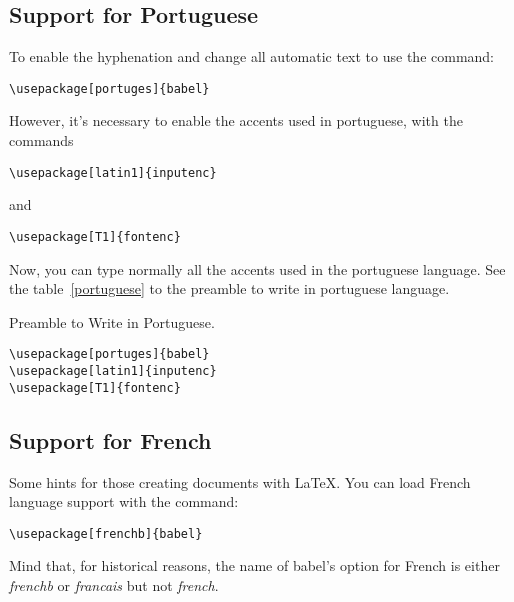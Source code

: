 \pagebreak[4]

\subsection{Support for Portuguese}

To enable the hyphenation and change all automatic text to 
 use the command:
\begin{lscommand}
\verb|\usepackage[portuges]{babel}|
\end{lscommand}

However, it's necessary to enable the accents used in portuguese, with the
commands
\begin{lscommand}
\verb|\usepackage[latin1]{inputenc}|
\end{lscommand}
and
\begin{lscommand}
\verb|\usepackage[T1]{fontenc}|
\end{lscommand}

Now, you can type normally all the accents used in the portuguese language.
See the table~\ref{portuguese} to the preamble to write in portuguese language.

\begin{table}[!hbp]
\caption{Preamble to Write in Portuguese.} \label{portuguese}
\begin{lined}{5cm}
\begin{verbatim}
\usepackage[portuges]{babel}
\usepackage[latin1]{inputenc}
\usepackage[T1]{fontenc}
\end{verbatim}
\bigskip
\end{lined}
\end{table}

\subsection{Support for French}

Some hints for those creating  documents with \LaTeX{}. 
You can load French language support with the command:

\begin{lscommand}
\verb|\usepackage[frenchb]{babel}|
\end{lscommand}

Mind that, for historical reasons, the name of \textsf{babel}'s option 
for French is either \emph{frenchb} or \emph{francais} but not \emph{french}.

